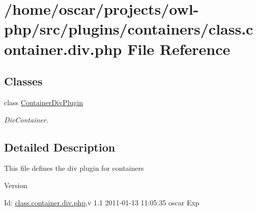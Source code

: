 \section{/home/oscar/projects/owl-\/php/src/plugins/containers/class.container.div.php File Reference}
\label{class_8container_8div_8php}
\subsection*{Classes}
\begin{DoxyCompactItemize}
\item 
class \hyperlink{classContainerDivPlugin}{ContainerDivPlugin}
\begin{DoxyCompactList}\small\item\em DivContainer. \item\end{DoxyCompactList}\end{DoxyCompactItemize}


\subsection{Detailed Description}
This file defines the div plugin for containers \begin{DoxyVersion}{Version}

\end{DoxyVersion}
\begin{DoxyParagraph}{Id:}
\hyperlink{class_8container_8div_8php}{class.container.div.php},v 1.1 2011-\/01-\/13 11:05:35 oscar Exp 
\end{DoxyParagraph}
